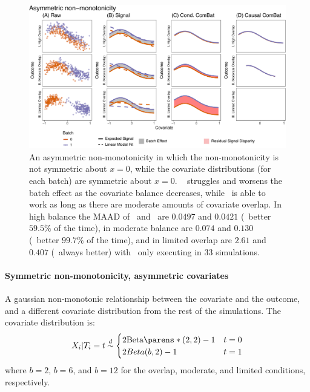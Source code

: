 {{{{\begin{figure}[h]
    \centering
    \includegraphics[width=\linewidth]{Figures/Supplement/Simulations/sim_nlin_adjust_nm_asy.pdf}
    \caption{An asymmetric non-monotonicity in which the non-monotonicity is not symmetric about $x=0$, while the covariate distributions (for each batch) are symmetric about $x=0$. \ccombat~ struggles and worsens the batch effect as the covariate balance decreases, while \cccombat~is able to work as long as there are moderate amounts of covariate overlap. In high balance the MAAD of \ccombat~and \cccombat~are $0.0497$ and $0.0421$ (\cccombat~better $59.5\%$ of the time), in moderate balance are $0.074$ and $0.130$ (\cccombat~better $99.7\%$ of the time), and in limited overlap are $2.61$ and $0.407$ (\cccombat~always better) with \cccombat~only executing in $33$ simulations.}
    \label{fig:sim_nlin_adjust_nm_asy}
\end{figure}


\paragraph*{Symmetric non-monotonicity, asymmetric covariates} A gaussian non-monotonic relationship between the covariate and the outcome, and a different covariate distribution from the rest of the simulations. The covariate distribution is:
\begin{align*}
    X_i | T_i = t \distas{d} \begin{cases}
        2\Beta(2, 2) - 1 & t = 0 \\
        2Beta(b, 2) - 1 & t = 1
    \end{cases}
\end{align*}
where $b = 2$, $b=6$, and $b=12$ for the overlap, moderate, and limited conditions, respectively.

}}}}
